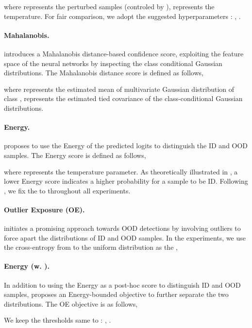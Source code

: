 \documentclass{article}
\theoremstyle{plain}
\theoremstyle{definition}
\theoremstyle{remark}
\begin{document}
where  represents the perturbed samples (controled by ),  represents the temperature. For fair comparison, we adopt the suggested hyperparameters \citep{LiangLS18}: , .

\paragraph{Mahalanobis.} \citep{10.5555/3327757.3327819} introduces a Mahalanobis distance-based confidence score, exploiting the feature space of the neural networks by inspecting the class conditional Gaussian distributions. The Mahalanobis distance score is defined as follows,

where  represents the estimated mean of multivariate Gaussian distribution of class ,  represents the estimated tied covariance of the  class-conditional Gaussian distributions.

\paragraph{Energy.} \citep{liu2020energy} proposes to use the Energy of the predicted logits to distinguish the ID and OOD samples. The Energy score is defined as follows,

where  represents the temperature parameter. As theoretically illustrated in \citet{liu2020energy}, a lower Energy score indicates a higher probability for a sample to be ID. Following \citep{liu2020energy}, we fix the  to  throughout all experiments.

\paragraph{Outlier Exposure (OE).} \citep{hendrycks2018deep} initiates a promising approach towards OOD detections by involving outliers to force apart the distributions of ID and OOD samples. In the experiments, we use the cross-entropy from to the uniform distribution as the  \citep{LeeLLS18},
  

\paragraph{Energy (w. ).} In addition to using the Energy as a post-hoc score to distinguish ID and OOD samples, \citep{liu2020energy} proposes an Energy-bounded objective to further separate the two distributions. The OE objective is as follows,

We keep the thresholds same to \citep{liu2020energy}: , .
\end{document}
